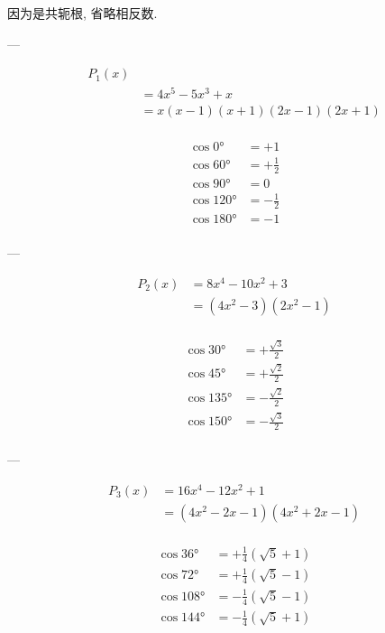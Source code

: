 \usepackage{amsmath}
\usepackage[utf8]{inputenc}
\usepackage[T1]{fontenc}


因为是共轭根, 省略相反数.

---

$$
\begin{aligned}
    P_{1}(x) \\
    &= 4 x^5-5 x^3+x\\
    &= x(x-1)(x+1)(2x-1)(2x+1)\\
\end{aligned}
$$

$$
\begin{aligned}
    \cos 0°   &= +1\\
    \cos 60°  &= +\frac{1}{2}\\
    \cos 90°  &= 0\\
    \cos 120° &= -\frac{1}{2}\\
    \cos 180° &= -1\\
\end{aligned}
$$

---

$$
\begin{aligned}
    P_{2}(x)
    &= 8 x^4-10 x^2+3\\
    &= \left(4 x^2-3\right) \left(2 x^2-1\right)\\
\end{aligned}
$$

$$
\begin{aligned}
    \cos 30°  &= +\frac{\sqrt{3}}{2}\\
    \cos 45°  &= +\frac{\sqrt{2}}{2}\\
    \cos 135° &= -\frac{\sqrt{2}}{2}\\
    \cos 150° &= -\frac{\sqrt{3}}{2}\\
\end{aligned}
$$

---

$$
\begin{aligned}
    P_{3}(x)
    &= 16 x^4-12 x^2+1\\
    &= \left(4 x^2-2 x-1\right) \left(4 x^2+2 x-1\right)\\
\end{aligned}
$$

$$
\begin{aligned}
    \cos 36°  &= +\frac{1}{4} \left(\sqrt{5}+1\right)\\
    \cos 72°  &= +\frac{1}{4} \left(\sqrt{5}-1\right)\\
    \cos 108° &= -\frac{1}{4} \left(\sqrt{5}-1\right)\\
    \cos 144° &= -\frac{1}{4} \left(\sqrt{5}+1\right)\\
\end{aligned}
$$

